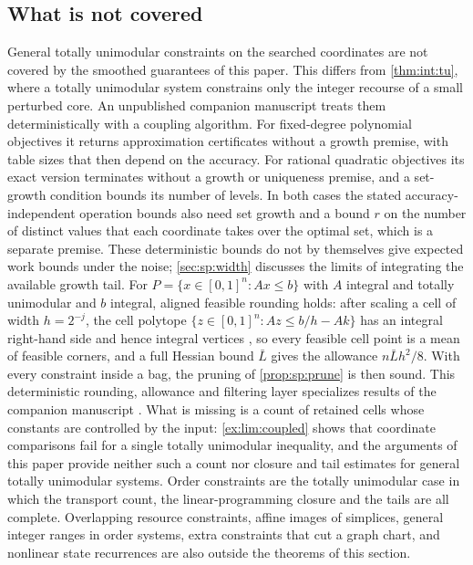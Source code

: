 \subsection{What is not covered}\label{sec:con:scope}

General totally unimodular constraints on the searched coordinates are not
covered by the smoothed guarantees of this paper. This differs from
\cref{thm:int:tu}, where a totally unimodular system constrains only the
integer recourse of a small perturbed core. An unpublished companion manuscript
\citep{companion-decomposition-aware} treats them deterministically with a
coupling algorithm. For fixed-degree polynomial objectives it returns
approximation certificates without a growth premise, with table sizes that
then depend on the accuracy. For rational quadratic objectives its exact
version terminates without a growth or uniqueness premise, and a set-growth
condition bounds its number of levels. In both cases the stated
accuracy-independent operation bounds also need set growth and a bound $r$
on the number of distinct values that each coordinate takes over the
optimal set, which is a separate premise. These deterministic bounds do not by themselves give expected
work bounds under the noise; \cref{sec:sp:width} discusses the limits of
integrating the available growth tail. For
$P=\{x\in[0,1]^n:Ax\le b\}$ with $A$ integral and totally unimodular and $b$
integral, aligned feasible rounding holds: after scaling a cell of width
$h=2^{-j}$, the cell polytope $\{z\in[0,1]^n:Az\le b/h-Ak\}$ has an integral
right-hand side and hence integral vertices
\citep{hoffman1956-integral-boundary-points-of-convex}, so every feasible cell point is a mean of feasible
corners, and a full Hessian bound $\bar L$ gives the allowance
$n\bar Lh^2/8$. With every constraint inside a bag, the pruning of
\cref{prop:sp:prune} is then sound. This deterministic rounding,
allowance and filtering layer specializes results of the companion
manuscript \citep{companion-decomposition-aware}. What is missing is a count of retained
cells whose constants are controlled by the input: \cref{ex:lim:coupled}
shows that coordinate comparisons fail for a single totally unimodular
inequality, and the arguments of this paper provide neither such a count
nor closure and tail estimates for general totally unimodular systems. Order
constraints are the totally unimodular case in which the transport count,
the linear-programming closure and the tails are all complete. Overlapping resource constraints, affine
images of simplices, general integer ranges in order systems, extra
constraints that cut a graph chart, and nonlinear state recurrences are also
outside the theorems of this section.


